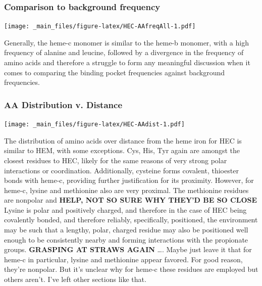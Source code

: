 \documentclass[a4paper, nobind]{templates/ociamthesis}
\let\origfigure\figure
\let\endorigfigure\endfigure
\renewenvironment{figure}[1][2] {
    \expandafter\origfigure\expandafter[H]
} {
    \endorigfigure
}
\begin{document}
\hypertarget{comparison-to-background-frequency}{%
\subsubsection{Comparison to background frequency}\label{comparison-to-background-frequency}}

\begin{figure}
\centering
\texttt{[image: \_main\_files/figure-latex/HEC-AAfreqAll-1.pdf]}
\caption{\label{fig:HEC-AAfreqAll}HEC: AA Frequency of Monomer}
\end{figure}

Generally, the heme-c monomer is similar to the heme-b monomer, with a high frequency of alanine and leucine, followed by a divergence in the frequency of amino acids and therefore a struggle to form any meaningful discussion when it comes to comparing the binding pocket frequencies against background frequencies.

\hypertarget{aa-distribution-v.-distance}{%
\subsubsection{AA Distribution v. Distance}\label{aa-distribution-v.-distance}}

\begin{figure}
\centering
\texttt{[image: \_main\_files/figure-latex/HEC-AAdist-1.pdf]}
\caption{\label{fig:HEC-AAdist}HEC: AA Distances}
\end{figure}

The distribution of amino acids over distance from the heme iron for HEC is similar to HEM, with some exceptions. Cys, His, Tyr again are amongst the closest residues to HEC, likely for the same reasons of very strong polar interactions or coordination. Additionally, cysteine forms covalent, thioester bonds with heme-c, providing further justification for its proximity. However, for heme-c, lysine and methionine also are very proximal. The methionine residues are nonpolar and \textbf{HELP, NOT SO SURE WHY THEY'D BE SO CLOSE} Lysine is polar and positively charged, and therefore in the case of HEC being covalently bonded, and therefore reliably, specifically, positioned, the environment may be such that a lengthy, polar, charged residue may also be positioned well enough to be consistently nearby and forming interactions with the propionate groups.
\textbf{GRASPING AT STRAWS AGAIN}
\ldots. Maybe just leave it that for heme-c in particular, lysine and methionine appear favored. For good reason, they're nonpolar. But it's unclear why for heme-c these residues are employed but others aren't. I've left other sections like that.
\end{document}
